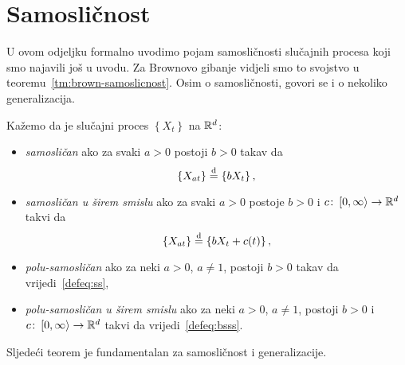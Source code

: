 \documentclass[main.tex]{subfiles}
\begin{document}
\nocite{*}

\section{Samosličnost}\label{sec:sp-ss}
U ovom odjeljku formalno uvodimo pojam samosličnosti
slučajnih procesa koji smo najavili još u uvodu. Za
Brownovo gibanje vidjeli smo to svojstvo u
teoremu~\ref{tm:brown-samoslicnost}.
Osim o samosličnosti, govori se i o nekoliko generalizacija.

\begin{definicija}
	Kažemo da je slučajni proces \( \left\{ X_t \right\} \) na \( \mathbb{R}^d \):
	\begin{itemize}
		\item \emph{samosličan} ako za svaki \( a > 0 \) postoji \( b > 0 \) takav da
		      \begin{equation}\label{defeq:ss}
			      \left\{ X_{at} \right\} \stackrel{\mathrm d}{=} \left\{ bX_t \right\},
		      \end{equation}
		\item \emph{samosličan u širem smislu} ako za svaki \( a > 0 \) postoje \( b > 0 \) i \( c\colon \left[0,\infty\right\rangle \to \mathbb{R}^d \) takvi da
		      \begin{equation}\label{defeq:bsss}
			      \left\{ X_{at}  \right\} \stackrel{\mathrm d}{=} \left\{ bX_t + c(t)  \right\},
		      \end{equation}
		\item \emph{polu-samosličan} ako za neki \( a > 0 \),  \( a \neq 1 \),  postoji \( b > 0 \) takav da
		      vrijedi~\eqref{defeq:ss},
		\item \emph{polu-samosličan u širem smislu} ako za neki \( a > 0 \), \( a \neq 1 \), postoji
		      \( b > 0 \) i \( c\colon \left[ 0,\infty\right\rangle \to \mathbb{R}^d \) takvi da vrijedi~\eqref{defeq:bsss}.
	\end{itemize}
\end{definicija}

Sljedeći teorem je fundamentalan za samosličnost i generalizacije.
\end{document}
